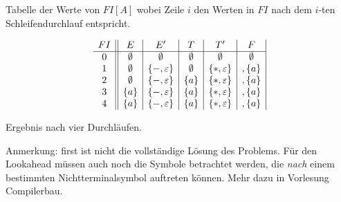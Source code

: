 {{Tabelle der Werte von $FI[A]$ wobei Zeile $i$ den Werten in $FI$ nach
dem $i$-ten Schleifendurchlauf entspricht.

\begin{displaymath}
  \begin{array}{c||c|c|c|c|c|}
    FI & E & E' & T & T' & F \\\hline
    0  & \emptyset & \emptyset & \emptyset & \emptyset & \emptyset \\
    1  & \emptyset & \{ -, \varepsilon \} & \emptyset & \{ *, \varepsilon \} & , \{a\} \\
    2  & \emptyset & \{ -, \varepsilon \} & \{a\} & \{ *, \varepsilon \} & , \{a\} \\
    3  & \{a\} & \{ -, \varepsilon \} & \{a\} & \{ *, \varepsilon \} & , \{a\} \\
    4  & \{a\} & \{ -, \varepsilon \} & \{a\} & \{ *, \varepsilon \} & , \{a\} \\
  \end{array}
\end{displaymath}

Ergebnis nach vier Durchläufen. 

Anmerkung: first ist nicht die vollständige Lösung des Problems. Für
den Lookahead müssen auch noch die Symbole betrachtet werden, die
\emph{nach} einem bestimmten Nichtterminalsymbol auftreten können. Mehr dazu
in Vorlesung Compilerbau. 
}}
